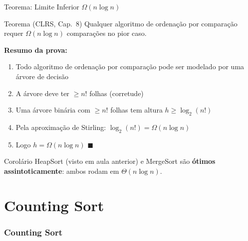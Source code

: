 \documentclass[aspectratio=169]{beamer}
\begin{document}
\begin{frame}[shrink=10]{Teorema: Limite Inferior $\Omega(n \log n)$}
  \begin{block}{Teorema (CLRS, Cap.\ 8)}
    Qualquer algoritmo de ordenação por comparação requer $\Omega(n \log n)$
    comparações no pior caso.
  \end{block}

  \medskip
  \textbf{Resumo da prova:}
  \begin{enumerate}
    \item Todo algoritmo de ordenação por comparação pode ser modelado por uma árvore de decisão
    \item A árvore deve ter $\geq n!$ folhas (corretude)
    \item Uma árvore binária com $\geq n!$ folhas tem altura $h \geq \log_2(n!)$
    \item Pela aproximação de Stirling: $\log_2(n!) = \Omega(n\log n)$
    \item Logo $h = \Omega(n\log n)$ \qquad $\blacksquare$
  \end{enumerate}

  \begin{alertblock}{Corolário}
    HeapSort (visto em aula anterior) e MergeSort são \textbf{ótimos assintoticamente}: ambos rodam em $\Theta(n\log n)$.
  \end{alertblock}
\end{frame}

\part{Counting Sort}
\section{Counting Sort}
\end{document}

